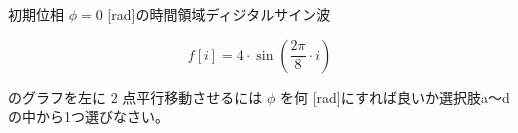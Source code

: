 初期位相 $\phi = 0$ [rad]の時間領域ディジタルサイン波 

\[
f[i] = 4 \cdot \sin \left ( \frac{2 \pi}{8}  \cdot i \right )
\]

\noindent のグラフを左に $2$ 点平行移動させるには $\phi$ を何 [rad]にすれば良いか選択肢a〜dの中から1つ選びなさい。
